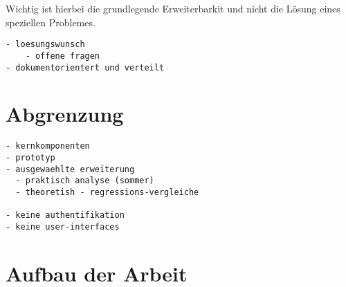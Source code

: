 Wichtig ist hierbei die grundlegende Erweiterbarkit
und nicht die L\"osung eines speziellen Problemes.


\begin{verbatim}
- loesungswunsch
    - offene fragen
- dokumentorientert und verteilt
\end{verbatim}

\section{Abgrenzung}

\begin{verbatim}
- kernkomponenten
- prototyp
- ausgewaehlte erweiterung
  - praktisch analyse (sommer)
  - theoretish - regressions-vergleiche

- keine authentifikation
- keine user-interfaces

\end{verbatim}

\section{Aufbau der Arbeit}


